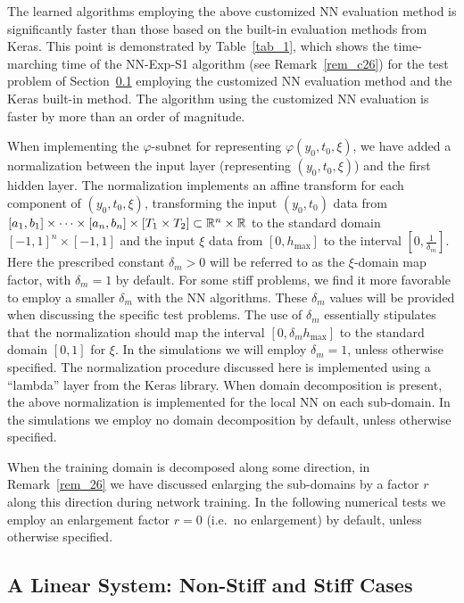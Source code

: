 The learned algorithms
employing the above customized NN evaluation method is significantly faster
than those based on the built-in evaluation methods from Keras.
This point is demonstrated by Table~\ref{tab_1}, which shows the time-marching time
of the NN-Exp-S1 algorithm (see Remark~\ref{rem_c26})
for the test problem of Section~\ref{sec_lin_model}
employing the customized NN evaluation method and the Keras built-in method.
The algorithm using the customized NN evaluation is faster by more
than an order of magnitude.



When implementing the $\varphi$-subnet for representing $\varphi(y_0,t_0,\xi)$,
we have added a normalization between the input layer
(representing $(y_0,t_0,\xi)$) and the first hidden layer. The normalization implements
an affine transform for each component of $(y_0,t_0,\xi)$, transforming
the input $(y_0,t_0)$ data
from $[a_1,b_1]\times\dots\times[a_n,b_n]\times[T_1\times T_2]\subset\mathbb{R}^n\times\mathbb{R}$ to
the standard domain $[-1,1]^n\times[-1,1]$ and
the input $\xi$ data from $[0,h_{\max}]$ to the interval
$[0,\frac{1}{\delta_m}]$. Here the prescribed constant $\delta_m>0$ will be referred
to as the $\xi$-domain map factor, with $\delta_m=1$ by default.
For some stiff problems, we find it more favorable to employ a smaller $\delta_m$
with the NN algorithms. These $\delta_m$ values will be provided when discussing
the specific test problems. The use of $\delta_m$ essentially stipulates
that the normalization should map the interval $[0,\delta_m h_{\max}]$
to the standard domain $[0,1]$ for $\xi$.
In the simulations  we will
employ $\delta_m=1$, unless otherwise specified.
The normalization procedure discussed here
is implemented using a ``lambda'' layer from the Keras library.
When domain decomposition is present, the above normalization is implemented
for the local NN  on each sub-domain.
In the simulations we employ no domain decomposition by default,
unless otherwise specified. 

When the training domain is decomposed along some direction,
in Remark~\ref{rem_26} we have discussed enlarging the sub-domains
by a factor $r$ along this direction during network training.
In the following numerical tests
we employ an enlargement factor $r=0$ (i.e.~no enlargement) by default,
unless otherwise specified.


\subsection{A Linear System: Non-Stiff and Stiff Cases}
\label{sec_lin_model}


